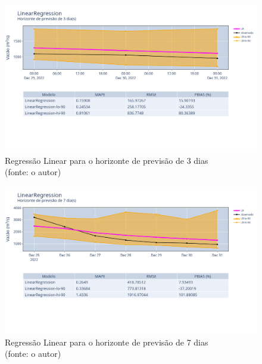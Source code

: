 \begin{figure}[!h]
	\centering
	\includegraphics[scale=0.33]{Figuras/jequiti/resultados/LinearRegression_fh3.png}
	\caption{Regressão Linear para o horizonte de previsão de 3 dias\\(fonte: o autor)}
	\label{fig:jequiti_LinearRegression_fh3}
\end{figure}

\begin{figure}[!h]
	\centering
	\includegraphics[scale=0.33]{Figuras/jequiti/resultados/LinearRegression_fh7.png}
	\caption{Regressão Linear para o horizonte de previsão de 7 dias\\(fonte: o autor)}
	\label{fig:jequiti_LinearRegression_fh7}
\end{figure}

